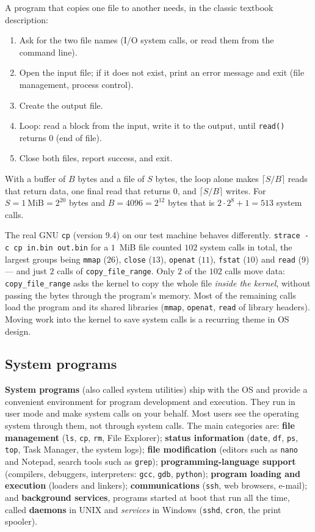 \documentclass[11pt,a4paper]{article}
\newcommand{\term}[1]{\textbf{\color{mintdeep}#1}}
\newcommand{\cmd}[1]{\texttt{#1}}
\begin{document}
\begin{example}
A program that copies one file to another needs, in the classic textbook description:
\begin{enumerate}[leftmargin=1.4em]
  \item Ask for the two file names (I/O system calls, or read them from the command line).
  \item Open the input file; if it does not exist, print an error message and exit (file management, process control).
  \item Create the output file.
  \item Loop: read a block from the input, write it to the output, until \cmd{read()} returns $0$ (end of file).
  \item Close both files, report success, and exit.
\end{enumerate}
With a buffer of $B$ bytes and a file of $S$ bytes, the loop alone makes $\lceil S/B \rceil$ reads that return data, one final read that returns $0$, and $\lceil S/B \rceil$ writes. For $S = 1\ \text{MiB} = 2^{20}$ bytes and $B = 4096 = 2^{12}$ bytes that is $2\cdot 2^{8} + 1 = 513$ system calls.

The real GNU \cmd{cp} (version 9.4) on our test machine behaves differently. \cmd{strace -c cp in.bin out.bin} for a $1$~MiB file counted $102$ system calls in total, the largest groups being \cmd{mmap} ($26$), \cmd{close} ($13$), \cmd{openat} ($11$), \cmd{fstat} ($10$) and \cmd{read} ($9$) --- and just $2$ calls of \cmd{copy\_file\_range}.
Only $2$ of the $102$ calls move data: \cmd{copy\_file\_range} asks the kernel to copy the whole file \emph{inside the kernel}, without passing the bytes through the program's memory. Most of the remaining calls load the program and its shared libraries (\cmd{mmap}, \cmd{openat}, \cmd{read} of library headers). Moving work into the kernel to save system calls is a recurring theme in OS design.
\end{example}

\subsection{System programs}

\term{System programs} (also called system utilities) ship with the OS and provide a convenient environment for program development and execution. They run in user mode and make system calls on your behalf. Most users see the operating system through them, not through system calls. The main categories are: \textbf{file management} (\cmd{ls}, \cmd{cp}, \cmd{rm}, File Explorer); \textbf{status information} (\cmd{date}, \cmd{df}, \cmd{ps}, \cmd{top}, Task Manager, the system logs); \textbf{file modification} (editors such as \cmd{nano} and Notepad, search tools such as \cmd{grep}); \textbf{programming-language support} (compilers, debuggers, interpreters: \cmd{gcc}, \cmd{gdb}, \cmd{python}); \textbf{program loading and execution} (loaders and linkers); \textbf{communications} (\cmd{ssh}, web browsers, e-mail); and \textbf{background services}, programs started at boot that run all the time, called \term{daemons} in UNIX and \emph{services} in Windows (\cmd{sshd}, \cmd{cron}, the print spooler).
\end{document}
